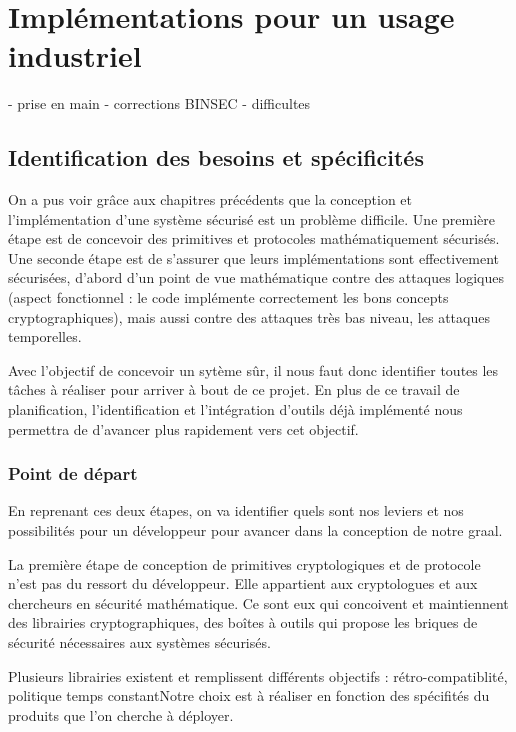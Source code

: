 \chapter{Implémentations pour un usage industriel}
\label{chap:erysichtonConception}


- prise en main
- corrections BINSEC
- difficultes


\section{Identification des besoins et spécificités}

On a pus voir grâce aux chapitres précédents que la conception et l'implémentation d'une système sécurisé est un problème difficile. Une première étape est de concevoir des primitives et protocoles mathématiquement sécurisés. Une seconde étape est de s’assurer que leurs implémentations sont effectivement sécurisées, d’abord d’un point de vue mathématique contre des attaques logiques (aspect fonctionnel : le code implémente correctement les bons concepts cryptographiques), mais aussi contre des attaques très bas niveau, les attaques temporelles. \medbreak

Avec l'objectif de concevoir un sytème sûr, il nous faut donc identifier toutes les tâches à réaliser pour arriver à bout de ce projet. En plus de ce travail de planification, l'identification et l'intégration d'outils déjà implémenté nous permettra de d'avancer plus rapidement vers cet objectif.\smallbreak


\subsection*{Point de départ}

En reprenant ces deux étapes, on va identifier quels sont nos leviers et nos possibilités pour un développeur pour avancer dans la conception de notre graal.\smallbreak

La première étape de conception de primitives cryptologiques et de protocole n'est pas du ressort du développeur. Elle appartient aux cryptologues et aux chercheurs en sécurité mathématique. Ce sont eux qui concoivent et maintiennent des librairies cryptographiques, des boîtes à outils qui propose les briques de sécurité nécessaires aux systèmes sécurisés.\medbreak

Plusieurs librairies existent \cite{OpenSSL, BearSSL, polubelova2020haclxn} et remplissent différents objectifs :  rétro-compatiblité, politique temps constant\etc Notre choix est à réaliser en fonction des spécifités du produits que l'on cherche à déployer.\medbreak

